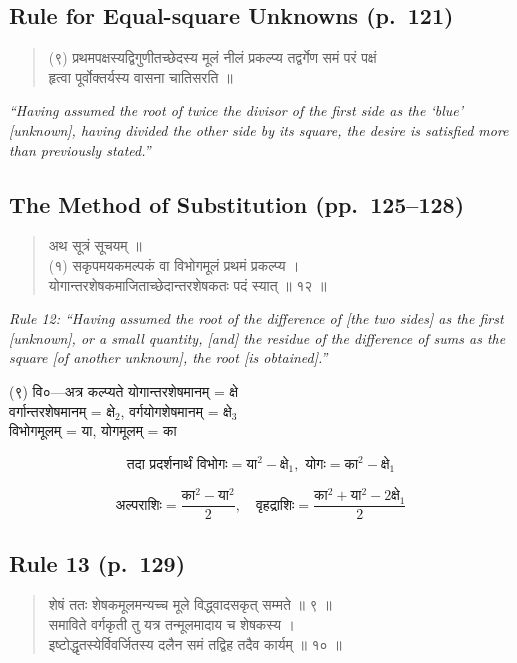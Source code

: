 \documentclass[11pt,a4paper]{article}
\newcommand{\cnote}[1]{\textcolor{notecolor}{\textit{#1}}}
\newcommand{\dev}[1]{{\devanagarifont #1}}
\newenvironment{sanskritverse}{%
  \begin{quote}
}{%
  \end{quote}
}
\begin{document}
\subsection*{Rule for Equal-square Unknowns (p.\ 121)}

\begin{sanskritverse}
\dev{%
(९) प्रथमपक्षस्यद्विगुणीतच्छेदस्य मूलं नीलं प्रकल्प्य तद्वर्गेण समं परं पक्षं\\
हृत्वा पूर्वोक्तर्यस्य वासना चातिसरति ॥}
\end{sanskritverse}

\cnote{``Having assumed the root of twice the divisor of the first side as the `blue' [unknown], having divided the other side by its square, the desire is satisfied more than previously stated.''}

\subsection{The Method of Substitution (pp.\ 125--128)}

\begin{sanskritverse}
\dev{%
अथ सूत्रं सूचयम् ॥\\[0.5em]
(१) सकृपमयकमल्पकं वा विभोगमूलं प्रथमं प्रकल्प्य ।\\
योगान्तरशेषकमाजिताच्छेदान्तरशेषकतः पदं स्यात् ॥ १२ ॥}
\end{sanskritverse}

\cnote{Rule 12: ``Having assumed the root of the difference of [the two sides] as the first [unknown], or a small quantity, [and] the residue of the difference of sums as the square [of another unknown], the root [is obtained].''}

\dev{%
(९) वि०—अत्र कल्प्यते योगान्तरशेषमानम् = क्षे\\
वर्गान्तरशेषमानम् = क्षे$_2$, वर्गयोगशेषमानम् = क्षे$_3$\\
विभोगमूलम् = या, योगमूलम् = का}

$$\text{तदा प्रदर्शनार्थं विभोगः} = \text{या}^2 - \text{क्षे}_1, \text{ योगः} = \text{का}^2 - \text{क्षे}_1$$

$$\text{अल्पराशिः} = \frac{\text{का}^2 - \text{या}^2}{2}, \quad \text{वृहद्राशिः} = \frac{\text{का}^2 + \text{या}^2 - 2\text{क्षे}_1}{2}$$

\subsection*{Rule 13 (p.\ 129)}

\begin{sanskritverse}
\dev{%
शेषं ततः शेषकमूलमन्यच्च मूले विद्ध्वादसकृत् सम्मते ॥ ९ ॥\\
समाविते वर्गकृती तु यत्र तन्मूलमादाय च शेषकस्य ।\\
इष्टोद्धृतस्येर्विवर्जितस्य दलैन समं तद्विह तदैव कार्यम् ॥ १० ॥}
\end{sanskritverse}
\end{document}
